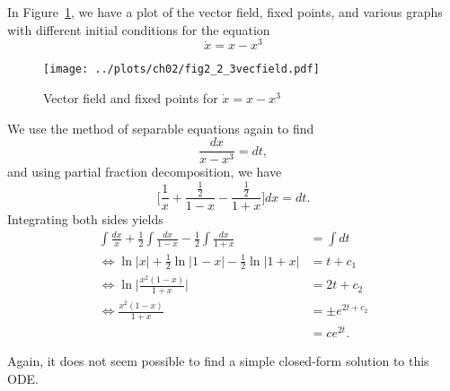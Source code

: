 
In Figure~\ref{fig2_2_3vecfield}, we have a plot of the vector field, fixed points,
and various graphs with different initial conditions for the equation 
\[
    \dot{x} = x - x^3
\]
\begin{figure}[!ht]
    \texttt{[image: ../plots/ch02/fig2\_2\_3vecfield.pdf]}
    \caption{Vector field and fixed points for $\dot{x} = x - x^3$\label{fig2_2_3vecfield}}
\end{figure}

We use the method of separable equations again to find 
\[
    \frac{dx}{x - x^3} = dt,
\]
and using partial fraction decomposition, we have
\[
    \biggl[\frac{1}{x} + \frac{\frac{1}{2}}{1 - x} - \frac{\frac{1}{2}}{1 + x} \biggr]dx
    = dt.
\]
Integrating both sides yields
\begin{equation*}
    \begin{split}
        \int \frac{dx}{x} + \frac{1}{2}\int \frac{dx}{1 - x} - \frac{1}{2}\int \frac{dx}{1 + x}
        &= \int dt \\
        \Leftrightarrow \ln{\lvert x \rvert} + \frac{1}{2}\ln{\lvert 1 - x \rvert}
        - \frac{1}{2}\ln{\lvert 1 + x \rvert}
        &= t + c_1 \\
        \Leftrightarrow \ln{\biggl \lvert \frac{x^2(1 - x)}{1 + x} \biggr \rvert}
        &= 2t + c_2 \\
        \Leftrightarrow \frac{x^2(1 - x)}{1 + x}
        &= \pm e^{2t + c_2} \\
        &= ce^{2t}.
    \end{split}
\end{equation*}

Again, it does not seem possible to find a simple closed-form solution to this ODE.
